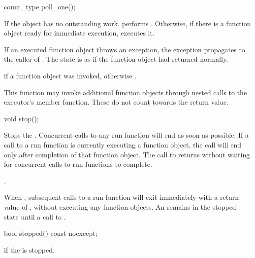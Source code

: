 %
\begin{itemdecl}
count_type poll_one();
\end{itemdecl}

\begin{itemdescr}
\pnum
\effects If the  object has no outstanding work, performs . Otherwise, if there is a function object ready for immediate execution, executes it.

\pnum
If an executed function object throws an exception, the exception propagates to the caller of . The  state is as if the function object had returned normally.

\pnum
\returns {} if a function object was invoked, otherwise .

\pnum
\remarks This function may invoke additional function objects through nested calls to the  executor's  member function. These do not count towards the return value.
\end{itemdescr}

%
\begin{itemdecl}
void stop();
\end{itemdecl}

\begin{itemdescr}
\pnum
\effects Stops the . Concurrent calls to any run function will end as soon as possible. If a call to a run function is currently executing a function object, the call will end only after completion of that function object. The call to  returns without waiting for concurrent calls to run functions to complete.

\pnum
\postconditions {}.

\pnum
\begin{note} When , subsequent calls to a run function will exit immediately with a return value of , without executing any function objects. An  remains in the stopped state until a call to . \end{note}
\end{itemdescr}

%
\begin{itemdecl}
bool stopped() const noexcept;
\end{itemdecl}

\begin{itemdescr}
\pnum
\returns {} if the  is stopped.
\end{itemdescr}

